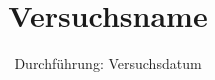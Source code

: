 


\subject{VXX}
\title{Versuchsname}
\date{
Durchführung: Versuchsdatum
}





\maketitle
\thispagestyle{empty}
\tableofcontents
\newpage


%

\newpage



\printbibliography


